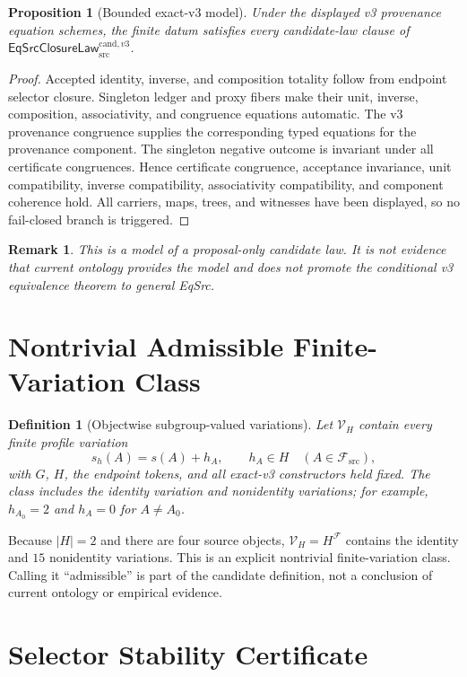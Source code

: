 \documentclass[11pt]{article}
\newtheorem{definition}{Definition}
\newtheorem{proposition}{Proposition}
\newtheorem{remark}{Remark}
\newcommand{\Law}{\mathsf{EqSrcClosureLaw}^{\mathrm{cand},v3}_{\mathrm{src}}}
\newcommand{\Vary}{\mathcal V_H}
\begin{document}
\begin{proposition}[Bounded exact-v3 model]
Under the displayed v3 provenance equation schemes, the finite datum
satisfies every candidate-law clause of \(\Law\).
\end{proposition}

\begin{proof}
Accepted identity, inverse, and composition totality follow from endpoint
selector closure. Singleton ledger and proxy fibers make their unit, inverse,
composition, associativity, and congruence equations automatic. The v3
provenance congruence supplies the corresponding typed equations for the
provenance component. The singleton negative outcome is invariant under all
certificate congruences. Hence certificate congruence, acceptance invariance,
unit compatibility, inverse compatibility, associativity compatibility, and
component coherence hold. All carriers, maps, trees, and witnesses have been
displayed, so no fail-closed branch is triggered.
\end{proof}

\begin{remark}
This is a model of a proposal-only candidate law. It is not evidence that
current ontology provides the model and does not promote the conditional v3
equivalence theorem to general EqSrc.
\end{remark}

\section{Nontrivial Admissible Finite-Variation Class}

\begin{definition}[Objectwise subgroup-valued variations]
Let \(\Vary\) contain every finite profile variation
\[
 s_h(A)=s(A)+h_A,\qquad h_A\in H
 \quad(A\in\mathcal F_{\mathrm{src}}),
\]
with \(G\), \(H\), the endpoint tokens, and all exact-v3 constructors held
fixed. The class includes the identity variation and nonidentity variations;
for example, \(h_{A_0}=2\) and \(h_A=0\) for \(A\neq A_0\).
\end{definition}

Because \(|H|=2\) and there are four source objects, \(\Vary=H^{\mathcal F}\)
contains the identity and \(15\) nonidentity variations. This is an explicit
nontrivial finite-variation class. Calling it
``admissible'' is part of the candidate definition, not a conclusion of
current ontology or empirical evidence.

\section{Selector Stability Certificate}
\end{document}
